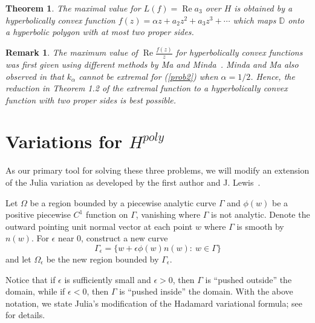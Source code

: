 \documentclass{cmft}
\newcommand{\dsp}{\displaystyle}
\newcommand{\D}{\mathbb{D}}
\newcommand{\e}{\epsilon}
\newcommand{\al}{\alpha}
\DeclareMathOperator{\re}{Re}
\newtheorem{theorem}{Theorem}[section]
\newtheorem{remark}{Remark}[section]
\begin{document}
\begin{theorem}
The maximal value for $\dsp L(f)=\re a_3$ over $H$ is obtained by a hyperbolically
convex function $f(z)= \al z + a_2z^2 +
a_3z^3 + \cdots$ which maps $\D$ onto a hyperbolic polygon with at most
two proper sides.
\end{theorem}

\begin{remark} 
The maximum value of $\re \frac{f(z)}{z}$ for hyperbolically convex functions
was first given using different methods by  Ma and Minda~\cite{MM94}. 
Minda and Ma also observed in \cite{MM94} that $k_{\al}$
cannot be extremal for (\ref{prob2}) when  $\al = 1/2$.  Hence, the reduction in
Theorem 1.2 of the extremal function to a hyperbolically convex function with 
two proper sides is best possible.
\end{remark}

\section{Variations for $H^{poly}$}
As our primary tool for solving these three 
problems, we will modify an extension of
the Julia variation as developed by the first author and
J. Lewis~\cite{BS84,BL75}.

Let $\Omega$ be a region bounded by a piecewise analytic curve $\Gamma$ and
$\phi(w)$ be a positive piecewise $C^1$ function on $\Gamma$, vanishing where
$\Gamma$ is not analytic.  Denote the outward pointing unit normal vector at each
point $w$ where $\Gamma$ is smooth by $n(w)$.  For $\e$ near $0$, construct a new
curve
\[
\Gamma_\e=\{w+\e\phi(w)n(w):\: w\in\Gamma\}
\]
and let $\Omega_\e$ be the new region bounded by $\Gamma_\e$.


Notice that if $\e$ is sufficiently small and $\e >0$, then $\Gamma$ is ``pushed
outside'' the domain, while if $\e < 0$, then $\Gamma$ is ``pushed inside'' the
domain.  With the above notation, we state Julia's modification of the Hadamard
variational formula; see~\cite{BS84} for details.
\end{document}
